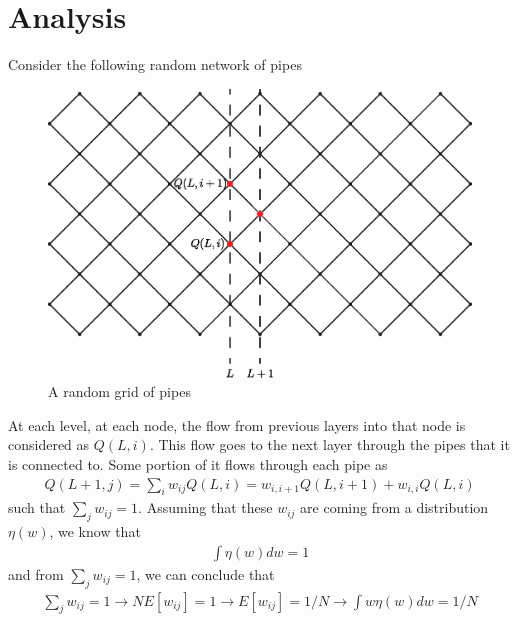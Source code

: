 \section{Analysis}
%
Consider the following random network of pipes
%
\begin{figure}[h]
  \centering
  \includegraphics[width=12cm]{./Figs/grid2.eps}
  \caption{A random grid of pipes} \label{fig-grid}
\end{figure}
%
At each level, at each node, the flow from previous layers into that
node is considered as $Q(L,i)$.  This flow goes to the next layer
through the pipes that it is connected to. Some portion of it flows
through each pipe as
%
\begin{align}
  Q(L+1,j) = \sum_i w_{ij} Q(L,i) = w_{i,i+1} Q(L,i+1) + w_{i,i} Q(L,i) 
\end{align}
%
such that $\sum_{j} w_{ij} = 1$. Assuming that these $w_{ij}$ are
coming from a distribution $\eta(w)$, we know that
%
\begin{align}
 \boxed{ \int \eta(w) dw = 1 }
\end{align}
%
and from $\sum_jw_{ij} = 1$, we can conclude that
%
\begin{align}
  \sum_j w_{ij}=1 \to N {E}[w_{ij}] = 1 \to E[w_{ij}] = 1/N \to \boxed{\int w\eta(w) dw = 1/N}
\end{align}
%

